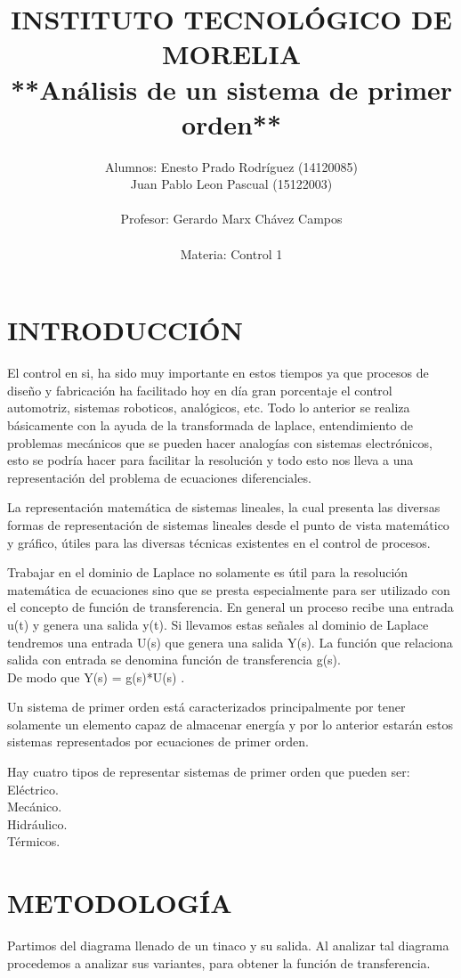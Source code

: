 \documentclass{article}
\title{INSTITUTO TECNOLÓGICO DE MORELIA\\ **Análisis de un sistema de primer orden**}
\author{Alumnos: Enesto Prado Rodríguez (14120085)\\Juan Pablo Leon Pascual (15122003) \\ \\ Profesor: Gerardo Marx Chávez Campos \\ \\ Materia: Control 1}
\begin{document}
\maketitle
\newpage\section{INTRODUCCIÓN}
El control en si, ha sido muy importante en estos tiempos ya que procesos de diseño y fabricación ha facilitado hoy en día  gran porcentaje el control automotriz, sistemas roboticos, analógicos, etc. Todo lo anterior se realiza básicamente con la ayuda de la transformada de laplace, entendimiento de problemas mecánicos que se pueden hacer analogías con sistemas electrónicos, esto se podría hacer para facilitar la resolución y todo esto nos lleva a una representación del problema de ecuaciones diferenciales.

 La representación matemática de sistemas lineales, la cual presenta las
 diversas formas de representación de sistemas lineales desde el punto de vista matemático y gráfico, útiles
 para las diversas técnicas existentes en el control de procesos.

Trabajar en el dominio de Laplace no solamente es útil para la resolución matemática de ecuaciones sino que se presta especialmente para ser utilizado con el concepto de
función de transferencia. En general un proceso recibe una entrada u(t) y genera una
salida y(t). Si llevamos estas señales al dominio de Laplace tendremos una entrada
U(s) que genera una salida Y(s). La función que relaciona salida con entrada se
denomina función de transferencia g(s). \\
De modo que Y(s) = g(s)*U(s) .

Un sistema de primer orden está caracterizados principalmente por tener solamente un elemento capaz de almacenar energía y por lo anterior estarán estos sistemas representados por ecuaciones de primer orden.

Hay cuatro tipos de representar sistemas de primer orden que pueden ser:\\
Eléctrico.\\
Mecánico.\\
Hidráulico.\\
Térmicos.\\



\newpage\section{METODOLOGÍA}
Partimos del diagrama llenado de un tinaco y su salida. Al analizar tal diagrama procedemos a analizar sus variantes, para obtener la función de transferencia.
\end{document}

